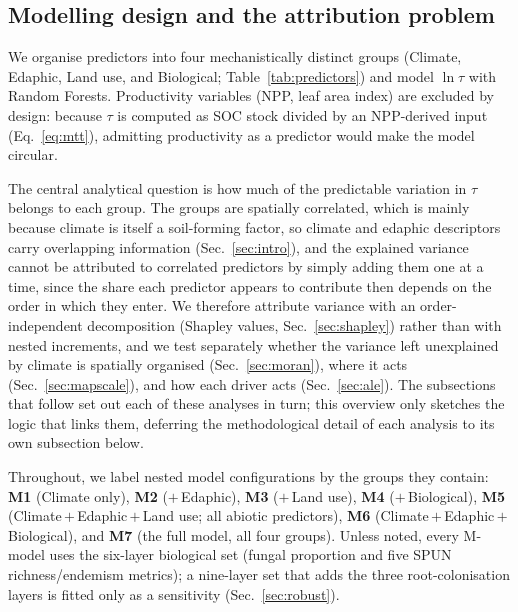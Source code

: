 \documentclass[12pt, a4paper]{article}
\begin{document}
\subsection{Modelling design and the attribution problem}
We organise predictors into four mechanistically distinct groups (Climate,
Edaphic, Land use, and Biological; Table~\ref{tab:predictors}) and model
$\ln\tau$ with Random Forests. Productivity variables (NPP, leaf area index) are
excluded by design: because $\tau$ is computed as SOC stock divided by an
NPP-derived input (Eq.~\ref{eq:mtt}), admitting productivity as a predictor would
make the model circular.

The central analytical question is how much of the predictable variation in $\tau$
belongs to each group. The groups are spatially correlated, which is mainly because climate is itself a soil-forming factor, so
climate and edaphic descriptors carry overlapping information (Sec.~\ref{sec:intro}), and the explained variance cannot be attributed to correlated predictors by simply adding them one at a
time, since the share each predictor appears to contribute then depends on the order in which they enter. We
therefore attribute variance with an order-independent decomposition (Shapley
values, Sec.~\ref{sec:shapley}) rather than with nested increments, and we test
separately whether the variance left unexplained by climate is spatially organised
(Sec.~\ref{sec:moran}), where it acts (Sec.~\ref{sec:mapscale}), and how each
driver acts (Sec.~\ref{sec:ale}). The subsections that follow set out
each of these analyses in turn; this overview only sketches the logic that links
them, deferring the methodological detail of each analysis to its own subsection
below.

Throughout, we label nested model configurations by the groups they contain:
\textbf{M1} (Climate only), \textbf{M2} ($+$\,Edaphic), \textbf{M3} ($+$\,Land use),
\textbf{M4} ($+$\,Biological), \textbf{M5} (Climate\,$+$\,Edaphic\,$+$\,Land use;
all abiotic predictors), \textbf{M6} (Climate\,$+$\,Edaphic\,$+$\,Biological), and
\textbf{M7} (the full model, all four groups). Unless noted, every M-model uses the
six-layer biological set (fungal proportion and five SPUN richness/endemism metrics);
a nine-layer set that adds the three \citet{Barcelo2023} root-colonisation layers is
fitted only as a sensitivity (Sec.~\ref{sec:robust}).

\end{document}
